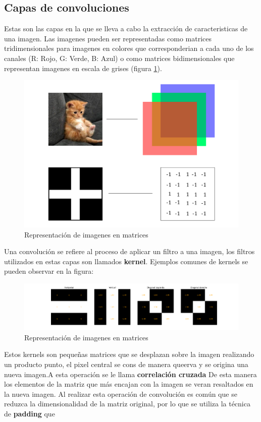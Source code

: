 \documentclass{article}
\begin{document}
\subsection{Capas de convoluciones}
Estas son las capas en la que se lleva a cabo la extracción de caracteristicas de una imagen. 
Las imagenes pueden ser representadas como matrices tridimensionales para imagenes en colores que corresponderian a cada uno de los canales (R: Rojo, G: Verde, B: Azul) o como matrices bidimensionales que representan imagenes en escala de grises (figura \ref{cat}). 
\begin{figure}[H]
    \centering
    \includegraphics[width=115mm]{cat.png}
    \caption{Representación de imagenes en matrices}
    \label{cat}
\end{figure}
Una convolución se refiere al proceso de aplicar un filtro a una imagen, los filtros utilizados en estas capas son llamados \textbf{kernel}. Ejemplos comunes de kernels se pueden observar en la figura: 
\begin{figure}[H]
    \centering 
    \includegraphics[width=170mm]{kernels.png}
    \caption{Representación de imagenes en matrices}
    \label{kernels}
\end{figure}
Estos kernels son pequeñas matrices que se desplazan sobre la imagen realizando un producto punto, el pixel central se cons de manera queerva y se origina una nueva imagen.A esta operación se le llama \textbf{correlación cruzada} De esta manera los elementos de la matriz que más encajan con la imagen se veran resaltados en la nueva imagen. Al realizar esta operación de convolución es común que se reduzca la dimensionalidad de la matriz original, por lo que se utiliza la técnica de \textbf{padding} que 
\end{document}
